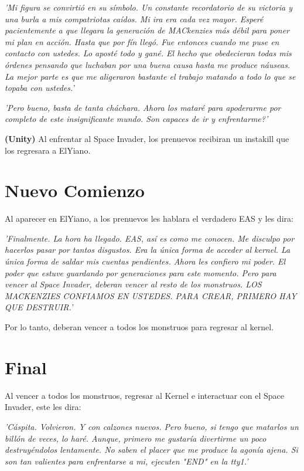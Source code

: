 \documentclass[a4paper,10pt]{article}
\begin{document}
	\textit{'Mi figura se convirtió en su símbolo. Un constante recordatorio de su victoria y una burla a mis compatriotas caídos. Mi ira era cada vez mayor. Esperé pacientemente a que llegara la generación de MACkenzies más débil para poner mi plan en acción. Hasta que por fín llegó. Fue entonces cuando me puse en contacto con ustedes. Lo aposté todo y gané. El hecho que obedecieran todas mis órdenes pensando que luchaban por una buena causa hasta me produce náuseas. La mejor parte es que me aligeraron bastante el trabajo matando a todo lo que se topaba con ustedes.'\\}
	
	\textit{'Pero bueno, basta de tanta cháchara. Ahora los mataré para apoderarme por completo de este insignificante mundo. Son capaces de ir y enfrentarme?'\\}
	
	\textbf{(Unity)} Al enfrentar al Space Invader, los prenuevos recibiran un instakill que los regresara a ElYiano.
	
	
\section{Nuevo Comienzo}
	Al aparecer en ElYiano, a los prenuevos les hablara el verdadero EAS y les dira:
	
	\textit{'Finalmente. La hora ha llegado. EAS, así es como me conocen. Me disculpo por hacerlos pasar por tantos disgustos. Era la única forma de acceder al kernel. La única forma de saldar mis cuentas pendientes. Ahora les confiero mi poder. El poder que estuve guardando por generaciones para este momento. Pero para vencer al Space Invader, deberan vencer al resto de los monstruos. LOS MACKENZIES CONFIAMOS EN USTEDES. PARA CREAR, PRIMERO HAY QUE DESTRUIR.'\\}
	
	Por lo tanto, deberan vencer a todos los monstruos para regresar al kernel.
	
\section{Final}
	Al vencer a todos los monstruos, regresar al Kernel e interactuar con el Space Invader, este les dira:
	
	\textit{'Cáspita. Volvieron. Y con calzones nuevos. Pero bueno, si tengo que matarlos un billón de veces, lo haré. Aunque, primero me gustaría divertirme un poco destruyéndolos lentamente. No saben el placer que me produce la agonía ajena. Si son tan valientes para enfrentarse a mi, ejecuten "END" en la tty1.'\\}
	
\end{document}
